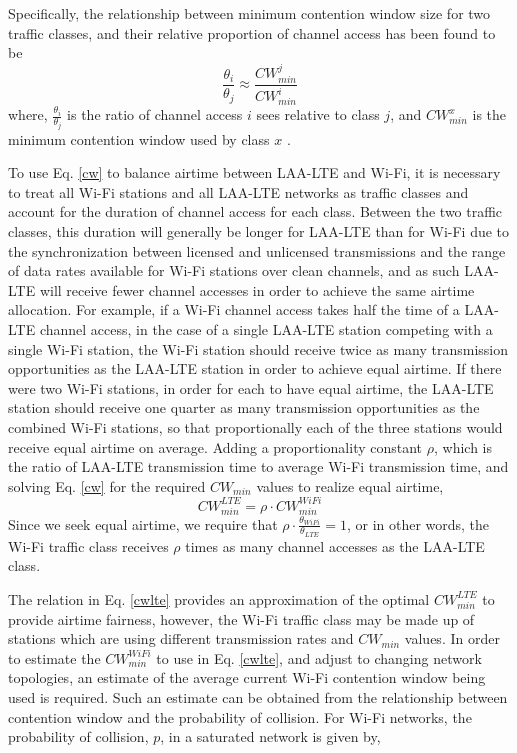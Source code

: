 Specifically, the relationship between minimum contention window size for two traffic classes, and their relative proportion of channel access has been found to be
\begin{equation}\label{cw}
\frac{\theta_i}{\theta_j} \approx \frac{CW^j_{min}}{CW^i_{min}}
\end{equation}
where, $\frac{\theta_i}{\theta_j}$ is the ratio of channel access $i$ sees relative to class $j$, and $CW^x_{min}$ is the minimum contention window used by class $x$ \cite{chou}\cite{yoon}.  

To use Eq. \ref{cw} to balance airtime between \mbox{LAA-LTE} and \mbox{Wi-Fi}, it is necessary to treat all \mbox{Wi-Fi} stations and all LAA-LTE networks as traffic classes and account for the duration of channel access for each class. Between the two traffic classes, this duration will generally be longer for LAA-LTE than for Wi-Fi due to the synchronization between licensed and unlicensed transmissions and the range of data rates available for Wi-Fi stations over clean channels, and as such LAA-LTE will receive fewer channel accesses in order to achieve the same airtime allocation. For example, if a \mbox{Wi-Fi} channel access takes half the time of a \mbox{LAA-LTE} channel access, in the case of a single \mbox{LAA-LTE} station competing with a single \mbox{Wi-Fi} station, the \mbox{Wi-Fi} station should receive twice as many transmission opportunities as the \mbox{LAA-LTE} station in order to achieve equal airtime.  If there were two \mbox{Wi-Fi} stations, in order for each to have equal airtime, the \mbox{LAA-LTE} station should receive one quarter as many transmission opportunities as the combined \mbox{Wi-Fi} stations, so that proportionally each of the three stations would receive equal airtime on average.  Adding a proportionality constant $\rho$, which is the ratio of \mbox{LAA-LTE} transmission time to average \mbox{Wi-Fi} transmission time, and solving Eq. \ref{cw} for the required $CW_{min}$ values to realize equal airtime,
\begin{equation}\label{cwlte}
CW^{LTE}_{min} = \rho\cdot{CW^{WiFi}_{min}}
\end{equation}
Since we seek equal airtime, we require that $\rho\cdot\frac{\theta_{WiFi}}{\theta_{LTE}} = 1$, or in other words, the Wi-Fi traffic class receives $\rho$ times as many channel accesses as the LAA-LTE class.

The relation in Eq. \ref{cwlte} provides an approximation of the optimal $CW^{LTE}_{min}$ to provide airtime fairness, however, the \mbox{Wi-Fi} traffic class may be made up of stations which are using different transmission rates and $CW_{min}$ values. In order to estimate the $CW^{WiFi}_{min}$ to use in Eq. \ref{cwlte}, and adjust to changing network topologies, an estimate of the average current Wi-Fi contention window being used is required.  Such an estimate can be obtained from the relationship between contention window and the probability of collision. For \mbox{Wi-Fi} networks, the probability of collision, $p$, in a saturated network is given by, 

